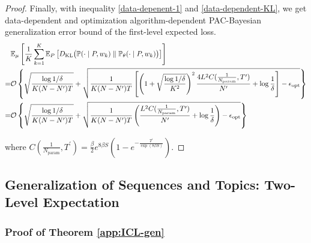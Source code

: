 \begin{proof}
	Finally, with inequality \ref{data-depenent-1} and  \ref{data-dependent-KL}, we get data-dependent and optimization algorithm-dependent PAC-Bayesian generalization error bound of the first-level expected loss.
	{\small \begin{align}
		&\mathbb{E}_{\mu}\left[\frac{1}{K}\sum_{k=1}^K\mathbb{E}_{P}\left[D_{\mathrm{KL}}\big(\mathbb{P}(\cdot\mid P,w_k)\parallel \mathbb{P}_{\theta}(\cdot\mid P,w_k)\big)\right]\right]\nonumber \\
		=&\mathcal{O}\left\{\sqrt{\frac{\log 1/\delta}{K(N-N^\prime)T}}+\sqrt{\frac{1}{K(N-N^\prime)T}\left[\left(1+\sqrt{\frac{\log 1/\delta}{K^2}}\right)^2 \frac{4L^2C(\frac{1}{N_{\text{param}}},{T^\prime})}{N^\prime}+\log \frac{1}{\delta}\right]-\epsilon_{\text{opt}}}\right\} \nonumber\\
        =&\mathcal{O}\left\{\sqrt{\frac{\log 1/\delta}{K(N-N^\prime)T}}+\sqrt{\frac{1}{K(N-N^\prime)T}\left(\frac{L^2C(\frac{1}{N_{\text{param}}},{T^\prime})}{N^\prime}+\log \frac{1}{\delta}\right)-\epsilon_{\text{opt}}}\right\}
	\end{align}}

	where $C(\frac{1}{N_{\text{param}}},{T^\prime})=\frac{\beta}{2}e^{8\beta S}\left(1-e^{-\frac{{T^\prime}}{\exp(8\beta S)}}\right)$.
\end{proof}

\subsection{Generalization of Sequences and Topics: Two-Level Expectation}
\subsubsection{Proof of Theorem \ref{app:ICL-gen}}\label{appendix-the-3}

